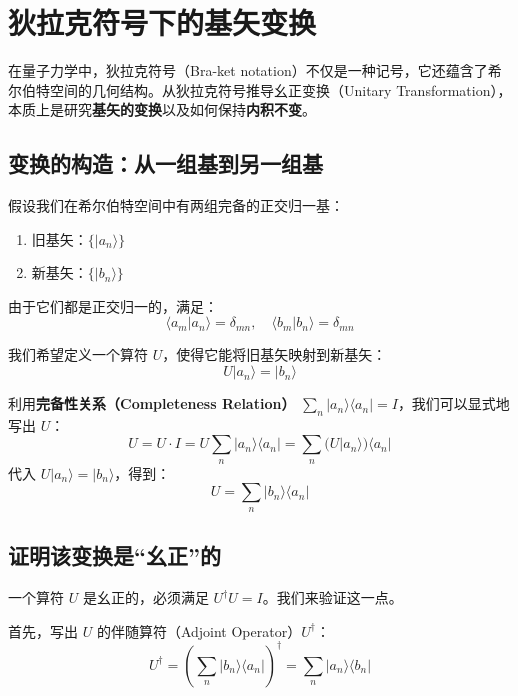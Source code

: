 \section{狄拉克符号下的基矢变换}
在量子力学中，狄拉克符号（Bra-ket notation）不仅是一种记号，它还蕴含了希尔伯特空间的几何结构。从狄拉克符号推导幺正变换（Unitary Transformation），本质上是研究\textbf{基矢的变换}以及如何保持\textbf{内积不变}。

\subsection{变换的构造：从一组基到另一组基}

假设我们在希尔伯特空间中有两组完备的正交归一基：
\begin{enumerate}
	\item 旧基矢：$\{|a_n\rangle\}$
	\item 新基矢：$\{|b_n\rangle\}$
\end{enumerate}

由于它们都是正交归一的，满足：
\begin{equation}
	\langle a_m | a_n \rangle = \delta_{mn}, \quad \langle b_m | b_n \rangle = \delta_{mn}
\end{equation}

我们希望定义一个算符 $U$，使得它能将旧基矢映射到新基矢：
\begin{equation}
	U |a_n\rangle = |b_n\rangle
\end{equation}

利用\textbf{完备性关系（Completeness Relation）} $\sum_n |a_n\rangle \langle a_n| = I$，我们可以显式地写出 $U$：
\begin{equation}
	U = U \cdot I = U \sum_n |a_n\rangle \langle a_n| = \sum_n (U |a_n\rangle) \langle a_n|
\end{equation}
代入 $U |a_n\rangle = |b_n\rangle$，得到：
\begin{equation}
	U = \sum_n |b_n\rangle \langle a_n|
\end{equation}

\subsection{证明该变换是“幺正”的}

一个算符 $U$ 是幺正的，必须满足 $U^\dagger U = I$。我们来验证这一点。

首先，写出 $U$ 的伴随算符（Adjoint Operator）$U^\dagger$：
\begin{equation}
	U^\dagger = \left( \sum_n |b_n\rangle \langle a_n| \right)^\dagger = \sum_n |a_n\rangle \langle b_n|
\end{equation}

